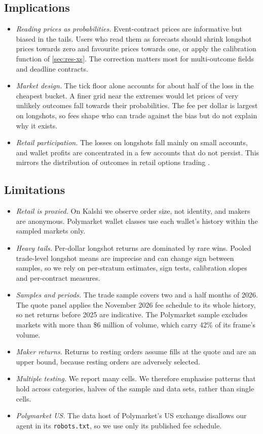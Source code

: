 \subsection{Implications}

\begin{itemize}
  \item \emph{Reading prices as probabilities.} Event-contract prices are informative but biased
  in the tails. Users who read them as forecasts should shrink longshot prices towards zero and
  favourite prices towards one, or apply the calibration function of \cref{sec:res-xs}. The
  correction matters most for multi-outcome fields and deadline contracts.
  \item \emph{Market design.} The tick floor alone accounts for about half of the loss in the
  cheapest bucket. A finer grid near the extremes would let prices of very unlikely outcomes fall
  towards their probabilities. The fee per dollar is largest on longshots, so fees shape who can
  trade against the bias but do not explain why it exists.
  \item \emph{Retail participation.} The losses on longshots fall mainly on small accounts, and
  wallet profits are concentrated in a few accounts that do not persist. This mirrors the
  distribution of outcomes in retail options trading \citep{bryzgalova2023}.
\end{itemize}

\subsection{Limitations}

\begin{itemize}
  \item \emph{Retail is proxied.} On Kalshi we observe order size, not identity, and makers are
  anonymous. Polymarket wallet classes use each wallet's history within the sampled markets only.
  \item \emph{Heavy tails.} Per-dollar longshot returns are dominated by rare wins. Pooled trade-level
  longshot means are imprecise and can change sign between samples, so we rely on per-stratum
  estimates, sign tests, calibration slopes and per-contract measures.
  \item \emph{Samples and periods.} The trade sample covers two and a half months of 2026. The
  quote panel applies the November 2026 fee schedule to its whole history, so net returns before
  2025 are indicative. The Polymarket sample excludes markets with more than \$6 million of
  volume, which carry 42\% of its frame's volume.
  \item \emph{Maker returns.} Returns to resting orders assume fills at the quote and are an upper
  bound, because resting orders are adversely selected.
  \item \emph{Multiple testing.} We report many cells. We therefore emphasise patterns that hold
  across categories, halves of the sample and data sets, rather than single cells.
  \item \emph{Polymarket US.} The data host of Polymarket's US exchange disallows our agent in
  its \texttt{robots.txt}, so we use only its published fee schedule.
\end{itemize}
